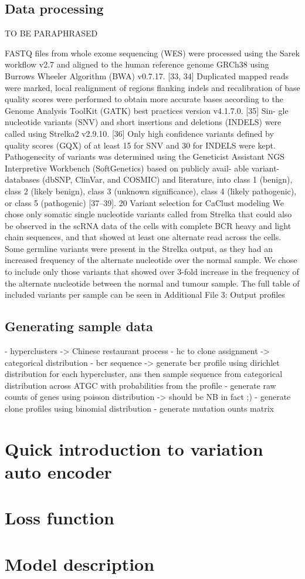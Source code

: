 \subsection{Data processing}
 TO BE PARAPHRASED
 
FASTQ files from whole exome sequencing (WES) were processed using the Sarek workflow v2.7
and aligned to the human reference genome GRCh38 using Burrows Wheeler Algorithm (BWA)
v0.7.17. [33, 34] Duplicated mapped reads were marked, local realignment of regions flanking
indels and recalibration of base quality scores were performed to obtain more accurate bases
according to the Genome Analysis ToolKit (GATK) best practices version v4.1.7.0. [35] Sin-
gle nucleotide variants (SNV) and short insertions and deletions (INDELS) were called using
Strelka2 v2.9.10. [36] Only high confidence variants defined by quality scores (GQX) of at least
15 for SNV and 30 for INDELS were kept. Pathogenecity of variants was determined using
the Geneticist Assistant NGS Interpretive Workbench (SoftGenetics) based on publicly avail-
able variant-databases (dbSNP, ClinVar, and COSMIC) and literature, into class 1 (benign),
class 2 (likely benign), class 3 (unknown significance), class 4 (likely pathogenic), or class 5
(pathogenic) [37–39].
20
Variant selection for CaClust modeling
We chose only somatic single nucleotide variants called from Strelka that could also be observed
in the scRNA data of the cells with complete BCR heavy and light chain sequences, and that
showed at least one alternate read across the cells.
Some germline variants were present in the Strelka output, as they had an increased frequency
of the alternate nucleotide over the normal sample. We chose to include only those variants that
showed over 3-fold increase in the frequency of the alternate nucleotide between the normal and
tumour sample. The full table of included variants per sample can be seen in Additional File 3:
Output profiles

\subsection{Generating sample data}
- hyperclusters -> Chinese restaurant process
- hc to clone assignment -> categorical distribution
- bcr sequence -> generate bcr profile using dirichlet distribution for each hypercluster, ans then sample sequence from
categorical distribution across ATGC with probabilities from the profile
- generate raw counts of genes using poisson distribution -> should be NB in fact ;)
- generate clone profiles using binomial distribution
- generate mutation  ounts matrix

\section{Quick introduction to variation auto encoder}
\section{Loss function}
\section{Model description}
